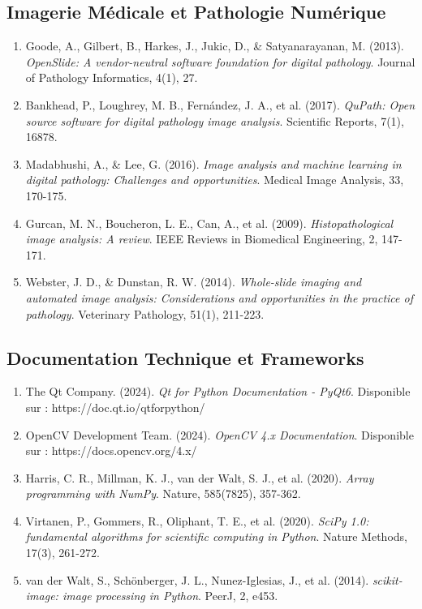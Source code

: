 \documentclass[12pt,a4paper]{article}
\begin{document}
\subsection{Imagerie Médicale et Pathologie Numérique}

\begin{enumerate}
\item Goode, A., Gilbert, B., Harkes, J., Jukic, D., \& Satyanarayanan, M. (2013). \textit{OpenSlide: A vendor-neutral software foundation for digital pathology}. Journal of Pathology Informatics, 4(1), 27.

\item Bankhead, P., Loughrey, M. B., Fernández, J. A., et al. (2017). \textit{QuPath: Open source software for digital pathology image analysis}. Scientific Reports, 7(1), 16878.

\item Madabhushi, A., \& Lee, G. (2016). \textit{Image analysis and machine learning in digital pathology: Challenges and opportunities}. Medical Image Analysis, 33, 170-175.

\item Gurcan, M. N., Boucheron, L. E., Can, A., et al. (2009). \textit{Histopathological image analysis: A review}. IEEE Reviews in Biomedical Engineering, 2, 147-171.

\item Webster, J. D., \& Dunstan, R. W. (2014). \textit{Whole-slide imaging and automated image analysis: Considerations and opportunities in the practice of pathology}. Veterinary Pathology, 51(1), 211-223.
\end{enumerate}

\subsection{Documentation Technique et Frameworks}

\begin{enumerate}
\item The Qt Company. (2024). \textit{Qt for Python Documentation - PyQt6}. Disponible sur : https://doc.qt.io/qtforpython/

\item OpenCV Development Team. (2024). \textit{OpenCV 4.x Documentation}. Disponible sur : https://docs.opencv.org/4.x/

\item Harris, C. R., Millman, K. J., van der Walt, S. J., et al. (2020). \textit{Array programming with NumPy}. Nature, 585(7825), 357-362.

\item Virtanen, P., Gommers, R., Oliphant, T. E., et al. (2020). \textit{SciPy 1.0: fundamental algorithms for scientific computing in Python}. Nature Methods, 17(3), 261-272.

\item van der Walt, S., Schönberger, J. L., Nunez-Iglesias, J., et al. (2014). \textit{scikit-image: image processing in Python}. PeerJ, 2, e453.
\end{enumerate}
\end{document}
